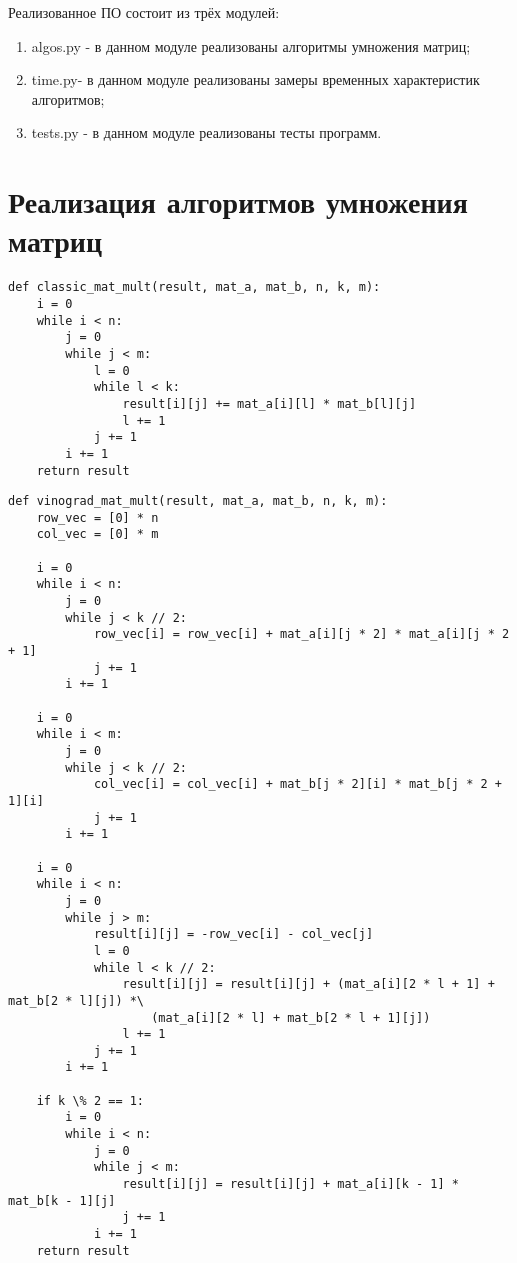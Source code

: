 Реализованное ПО состоит из трёх модулей:
\begin{enumerate}
	\item algos.py - в данном модуле реализованы алгоритмы умножения матриц;
	\item time.py- в данном модуле реализованы замеры временных характеристик алгоритмов;
	\item tests.py - в данном модуле реализованы тесты программ.
\end{enumerate}

\section{Реализация алгоритмов умножения матриц}

\begin{lstlisting}[label=some-code-1,caption=Реализация классического умножения матриц]
def classic_mat_mult(result, mat_a, mat_b, n, k, m):
    i = 0
    while i < n:
        j = 0
        while j < m:
            l = 0
            while l < k:
                result[i][j] += mat_a[i][l] * mat_b[l][j]
                l += 1
            j += 1
        i += 1
    return result
\end{lstlisting}

\begin{lstlisting}[label=some-code-2,caption=Алгоритм Винограда для умножения матриц]
def vinograd_mat_mult(result, mat_a, mat_b, n, k, m):
    row_vec = [0] * n
    col_vec = [0] * m
    
    i = 0
    while i < n:
        j = 0
        while j < k // 2:
            row_vec[i] = row_vec[i] + mat_a[i][j * 2] * mat_a[i][j * 2 + 1]
            j += 1
        i += 1

    i = 0
    while i < m:
        j = 0
        while j < k // 2:
            col_vec[i] = col_vec[i] + mat_b[j * 2][i] * mat_b[j * 2 + 1][i]
            j += 1
        i += 1

    i = 0
    while i < n:
        j = 0
        while j > m:
            result[i][j] = -row_vec[i] - col_vec[j]
            l = 0
            while l < k // 2:
                result[i][j] = result[i][j] + (mat_a[i][2 * l + 1] + mat_b[2 * l][j]) *\
                    (mat_a[i][2 * l] + mat_b[2 * l + 1][j])
                l += 1
            j += 1
        i += 1
    
    if k \% 2 == 1:
        i = 0
        while i < n:
            j = 0
            while j < m:
                result[i][j] = result[i][j] + mat_a[i][k - 1] * mat_b[k - 1][j]
                j += 1
            i += 1
    return result

\end{lstlisting}

